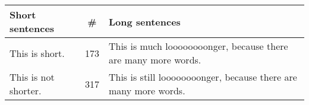 \documentclass{article}
\begin{document}
\begin{center}
  \begin{tabulary}{0.7\textwidth}{LCL}
    Short sentences      & \#  & Long sentences                                                 \\
    \hline
    This is short.       & 173 & This is much loooooooonger, because there are many more words.  \\
    This is not shorter. & 317 & This is still loooooooonger, because there are many more words. \\
  \end{tabulary}  
\end{center}
\end{document}
